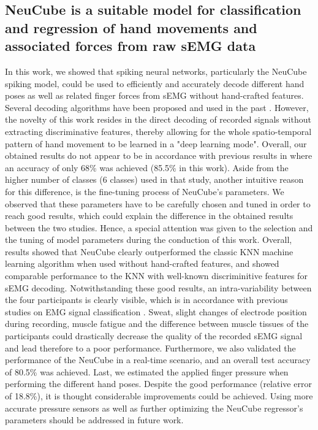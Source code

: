 \documentclass[journal,article,submit,moreauthors,pdftex,10pt,a4paper]{Definitions/mdpi}
\begin{document}
\subsection{NeuCube is a suitable model for  classification and regression of hand movements and associated forces from raw sEMG data}
In this work, we showed that spiking neural networks, particularly the NeuCube spiking model, could be used to efficiently and accurately decode different hand poses as well as related finger forces from sEMG without hand-crafted features. Several decoding algorithms have been proposed and used in the past \cite{47}. However, the novelty of  this work resides in the direct decoding of recorded signals without extracting discriminative features, thereby allowing for the whole spatio-temporal pattern of hand movement to be learned in a "deep learning mode". Overall, our obtained results do not appear to be in accordance with previous results in \cite{6} where an accuracy of only 68\% was achieved (85.5\% in this work). Aside from the higher number of classes (6 classes) used in that study, another intuitive reason for this difference, is the fine-tuning process of NeuCube's parameters. We observed that these parameters have to be carefully chosen and tuned in order to reach good results, which could explain the difference in the obtained results between the two studies.
Hence, a special attention was given to the selection and the tuning of model parameters during the conduction of this work. Overall, results showed that NeuCube clearly outperformed the classic KNN machine learning algorithm when used without hand-crafted features, and showed comparable performance to the KNN  with well-known discriminitive features for sEMG decoding. Notwithstanding these good results, an intra-variability between the four participants is clearly visible, which is in accordance with previous studies on EMG signal classification \cite{48}. Sweat, slight changes of electrode position during recording, muscle fatigue and the difference between muscle tissues of the participants could drastically decrease the quality of the recorded sEMG signal and lead therefore to a poor performance. 
Furthermore, we also validated the performance of the NeuCube in a real-time scenario, and an overall test accuracy of 80.5\% was achieved. 
Last, we estimated the applied finger pressure when performing the different hand poses. Despite the good performance (relative error of 18.8\%), it is thought considerable improvements could be achieved. Using more accurate pressure sensors as well as further optimizing the NeuCube regressor's parameters should be addressed in future work. 
\end{document}
